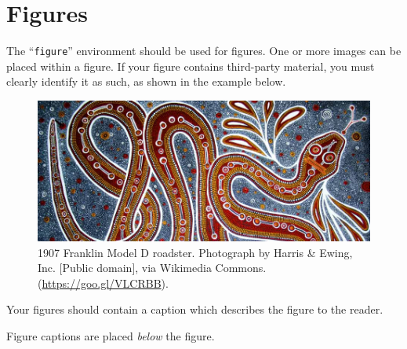 \documentclass[manuscript,screen,review]{acmart}
\begin{document}
{\section{Figures}

The ``\verb|figure|'' environment should be used for figures. One or
more images can be placed within a figure. If your figure contains
third-party material, you must clearly identify it as such, as shown
in the example below.
\begin{figure}[h]
  \centering
  \includegraphics[width=\linewidth]{snake.jpg}
  \caption{1907 Franklin Model D roadster. Photograph by Harris \&
    Ewing, Inc. [Public domain], via Wikimedia
    Commons. (\url{https://goo.gl/VLCRBB}).}
\end{figure}

Your figures should contain a caption which describes the figure to
the reader.

Figure captions are placed {\itshape below} the figure.
}
\end{document}
